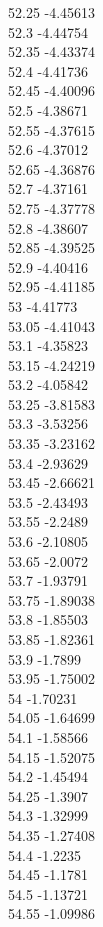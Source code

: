 {52.25	-4.45613\\
52.3	-4.44754\\
52.35	-4.43374\\
52.4	-4.41736\\
52.45	-4.40096\\
52.5	-4.38671\\
52.55	-4.37615\\
52.6	-4.37012\\
52.65	-4.36876\\
52.7	-4.37161\\
52.75	-4.37778\\
52.8	-4.38607\\
52.85	-4.39525\\
52.9	-4.40416\\
52.95	-4.41185\\
53	-4.41773\\
53.05	-4.41043\\
53.1	-4.35823\\
53.15	-4.24219\\
53.2	-4.05842\\
53.25	-3.81583\\
53.3	-3.53256\\
53.35	-3.23162\\
53.4	-2.93629\\
53.45	-2.66621\\
53.5	-2.43493\\
53.55	-2.2489\\
53.6	-2.10805\\
53.65	-2.0072\\
53.7	-1.93791\\
53.75	-1.89038\\
53.8	-1.85503\\
53.85	-1.82361\\
53.9	-1.7899\\
53.95	-1.75002\\
54	-1.70231\\
54.05	-1.64699\\
54.1	-1.58566\\
54.15	-1.52075\\
54.2	-1.45494\\
54.25	-1.3907\\
54.3	-1.32999\\
54.35	-1.27408\\
54.4	-1.2235\\
54.45	-1.1781\\
54.5	-1.13721\\
54.55	-1.09986\\
}
